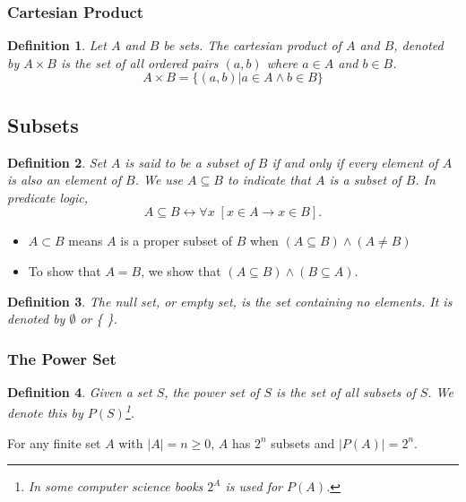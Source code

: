 \documentclass[12pt]{article}
\newtheorem{definition}{Definition} [section]
\begin{document}
\subsubsection{Cartesian Product}
\begin{definition} \emph{Let $A$ and $B$ be sets. The cartesian product of $A$ and $B$, denoted by $A\times B$ is the set of all ordered pairs $(a, b)$ where $a \in A$ and $b \in B$.}
\[A \times B = \{ (a, b) | a \in A \wedge b \in B \}\]
\end{definition}
\subsection{Subsets}
\begin{definition}
\emph{Set $A$ is said to be a subset of $B$ if and only if every element of $A$ is also an element of $B$. We use $A \subseteq B$ to indicate that $A$ is a subset of $B$. In predicate logic,} 
\[A \subseteq B \leftrightarrow \forall x \; [x \in A \rightarrow x \in B].\]
\end{definition}
\begin{itemize}
\item $A \subset B$ means $A$ is a proper subset of $B$ when $(A \subseteq B) \wedge (A \neq B)$
\item To show that $A=B$, we show that $(A \subseteq B) \wedge (B \subseteq A)$.
\end{itemize}
\begin{definition}\emph{The }null set, \emph{or }empty set, \emph{is the set containing no elements. It is denoted by $\emptyset$ or \{ \}.}\end{definition}
\subsubsection{The Power Set}
\begin{definition} \emph{Given a set $S$, the }power set \emph{of $S$ is the set of all subsets of $S$. We denote this by $P(S)$\footnote{In some computer science books $2^A$ is used for $P(A)$.}.}\end{definition}
For any finite set $A$ with $|A| = n \geq 0$, $A$ has $2^n$ subsets and $|P(A)| = 2^n$.
\end{document}
